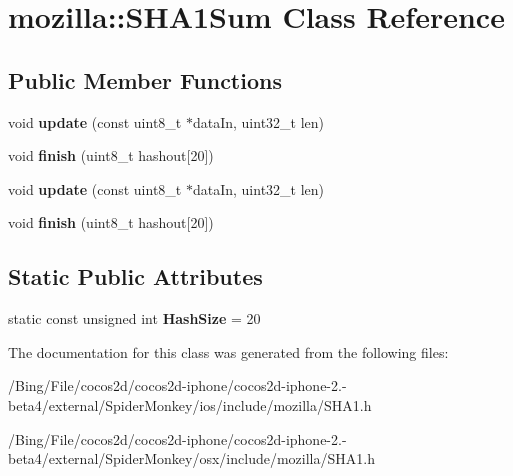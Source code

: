 \hypertarget{classmozilla_1_1_s_h_a1_sum}{\section{mozilla\-:\-:S\-H\-A1\-Sum Class Reference}
\label{classmozilla_1_1_s_h_a1_sum}
}
\subsection*{Public Member Functions}
\begin{DoxyCompactItemize}
\item 
\hypertarget{classmozilla_1_1_s_h_a1_sum_a0fa43d06daa79f5655867cbbc48ca525}{void {\bfseries update} (const uint8\-\_\-t $\ast$data\-In, uint32\-\_\-t len)}\label{classmozilla_1_1_s_h_a1_sum_a0fa43d06daa79f5655867cbbc48ca525}

\item 
\hypertarget{classmozilla_1_1_s_h_a1_sum_a74089dbef4864aeae4962041bba62937}{void {\bfseries finish} (uint8\-\_\-t hashout\mbox{[}20\mbox{]})}\label{classmozilla_1_1_s_h_a1_sum_a74089dbef4864aeae4962041bba62937}

\item 
\hypertarget{classmozilla_1_1_s_h_a1_sum_a0fa43d06daa79f5655867cbbc48ca525}{void {\bfseries update} (const uint8\-\_\-t $\ast$data\-In, uint32\-\_\-t len)}\label{classmozilla_1_1_s_h_a1_sum_a0fa43d06daa79f5655867cbbc48ca525}

\item 
\hypertarget{classmozilla_1_1_s_h_a1_sum_a74089dbef4864aeae4962041bba62937}{void {\bfseries finish} (uint8\-\_\-t hashout\mbox{[}20\mbox{]})}\label{classmozilla_1_1_s_h_a1_sum_a74089dbef4864aeae4962041bba62937}

\end{DoxyCompactItemize}
\subsection*{Static Public Attributes}
\begin{DoxyCompactItemize}
\item 
\hypertarget{classmozilla_1_1_s_h_a1_sum_a3cb46709a3cc758e701850070cb16996}{static const unsigned int {\bfseries Hash\-Size} = 20}\label{classmozilla_1_1_s_h_a1_sum_a3cb46709a3cc758e701850070cb16996}

\end{DoxyCompactItemize}


The documentation for this class was generated from the following files\-:\begin{DoxyCompactItemize}
\item 
/\-Bing/\-File/cocos2d/cocos2d-\/iphone/cocos2d-\/iphone-\/2.-\/beta4/external/\-Spider\-Monkey/ios/include/mozilla/S\-H\-A1.\-h\item 
/\-Bing/\-File/cocos2d/cocos2d-\/iphone/cocos2d-\/iphone-\/2.-\/beta4/external/\-Spider\-Monkey/osx/include/mozilla/S\-H\-A1.\-h\end{DoxyCompactItemize}
